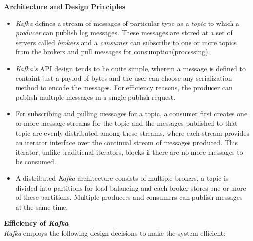 \documentclass[12pt, a4paper]{article}
\begin{document}
\textbf{Architecture and Design Principles}
\begin{itemize}
\item \textit{Kafka} defines a stream of messages of particular type as a \textit{topic} to which a  \textit{producer} can publish log messages. These messages are stored at a set of servers called \textit{brokers} and a \textit{consumer} can subscribe to one or more topics from the brokers and pull messages for consumption(processing).

\item \textit{Kafka's} API design tends to be quite simple, wherein a message is defined to containt just a paylod of bytes and the user can choose any serialization method to encode the messages. For efficiency reasons, the producer can publish multiple messages in a single publish request.

\item For subscribing and pulling messages for a topic, a consumer first creates one or more message streams for the topic and the messages published to that topic are evenly distributed among these streams, where each stream provides an iterator interface over the continual stream of messages produced. This iterator, unlike traditional iterators, blocks if there are no more messages to be consumed.

\item A distributed \textit{Kafka} architecture consists of multiple brokers, a topic is divided into partitions for load balancing and each broker stores one or more of these partitions. Multiple producers and consumers can publish messages at the same time.
\end{itemize}

\textbf{Efficiency of \textit{Kafka}}\\
\textit{Kafka} employs the following design decisions to make the system efficient:
\end{document}

